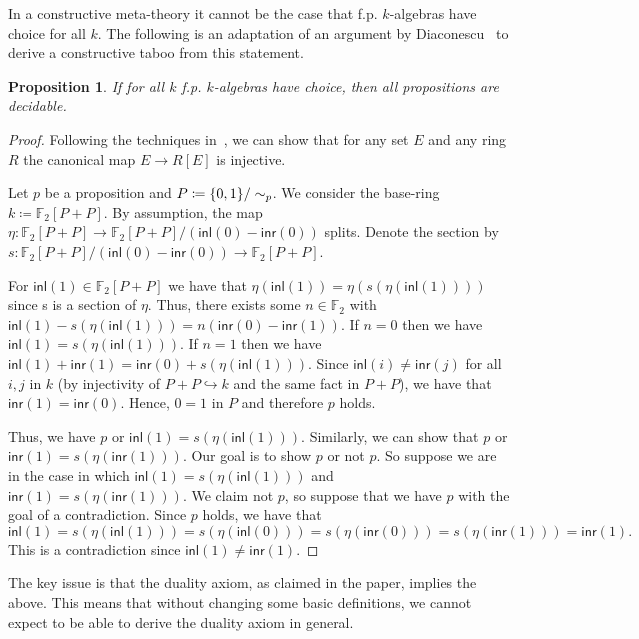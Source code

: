 \documentclass[10pt,a4paper]{article}
\newtheorem{proposition}[theorem]{Proposition}
\theoremstyle{definition}
\theoremstyle{remark}
\newcommand\inl{\mathsf{inl}}
\newcommand\inr{\mathsf{inr}}
\DeclarePairedDelimiter\set{\{}{\}}
\begin{document}
In a constructive meta-theory it cannot be the case that f.p. \(k\)-algebras have choice for all \(k\).
The following is an adaptation of an argument by Diaconescu~\cite{diaconescu1975choice} to derive a constructive taboo from this statement.

\begin{proposition}
  If for all \(k\) f.p. \(k\)-algebras have choice, then all propositions are decidable.
\end{proposition}
\begin{proof}
  Following the techniques in~\cite{mines}, we can show that for any set $E$ and any ring $R$ the canonical map $E \to R[E]$ is injective.

  Let $p$ be a proposition and $P \coloneqq \set{0,1} / \sim_p$.
  We consider the base-ring $k \coloneqq \mathbb{F}_2[P + P]$.
  By assumption, the map $\eta \colon \mathbb{F}_2[P + P] \to \mathbb{F}_2[P + P] / (\inl(0) - \inr(0))$ splits.
  Denote the section by $s : \mathbb{F}_2[P + P] / (\inl(0) - \inr(0)) \to \mathbb{F}_2[P + P]$.

  For $\inl(1) \in \mathbb{F}_2[P + P]$ we have that $\eta(\inl(1)) = \eta(s(\eta(\inl(1))))$ since s is a section of $\eta$.
  Thus, there exists some $n \in \mathbb{F}_2$ with $\inl(1) - s(\eta(\inl(1))) = n(\inr(0) - \inr(1))$.
  If $n = 0$ then we have $\inl(1) = s(\eta(\inl(1)))$.
  If $n = 1$ then we have $\inl(1) + \inr(1) = \inr(0) + s(\eta(\inl(1)))$.
  Since $\inl(i) \ne \inr(j)$ for all $i, j$ in $k$ (by injectivity of $P + P \hookrightarrow k$ and the same fact in $P + P$), we have that $\inr(1) = \inr(0)$.
  Hence, $0 = 1$ in $P$ and therefore $p$ holds.

  Thus, we have $p$ or $\inl(1) = s(\eta(\inl(1)))$.
  Similarly, we can show that $p$ or $\inr(1) = s(\eta(\inr(1)))$.
  Our goal is to show $p$ or not $p$.
  So suppose we are in the case in which $\inl(1) = s(\eta(\inl(1)))$ and $\inr(1) = s(\eta(\inr(1)))$.
  We claim not $p$, so suppose that we have $p$ with the goal of a contradiction.
  Since $p$ holds, we have that
  \[
    \inl(1) = s(\eta(\inl(1))) = s(\eta(\inl(0))) = s(\eta(\inr(0))) = s(\eta(\inr(1))) = \inr(1).
  \]
  This is a contradiction since $\inl(1) \ne \inr(1)$.
\end{proof}

The key issue is that the duality axiom, as claimed in the paper, implies the above.
This means that without changing some basic definitions, we cannot expect to be able to derive the duality axiom in general.
\end{document}
